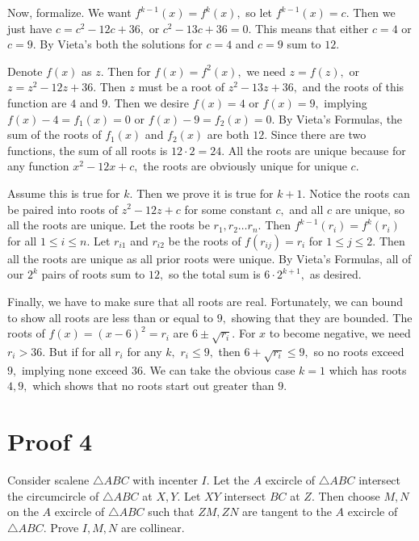 \documentclass{article}
\begin{document}
Now, formalize. We want $f^{k-1}(x)=f^{k}(x),$ so let $f^{k-1}(x)=c.$ Then we just have $c=c^2-12c+36,$ or $c^2-13c+36=0$. This means that either $c=4$ or $c=9.$ By Vieta's both the solutions for $c=4$ and $c=9$ sum to $12.$

\begin{sol}{}{}
Denote $f(x)$ as $z.$ Then for $f(x)=f^2(x),$ we need $z=f(z),$ or $z=z^2-12z+36.$ Then $z$ must be a root of $z^2-13z+36,$ and the roots of this function are $4$ and $9.$
Then we desire $f(x)=4$ or $f(x)=9,$ implying $f(x)-4=f_1(x)=0$ or $f(x)-9=f_2(x)=0.$ By Vieta's Formulas, the sum of the roots of $f_1(x)$ and $f_2(x)$ are both $12.$
Since there are two functions, the sum of all roots is $12\cdot 2=\boxed{24}.$
All the roots are unique because for any function $x^2-12x+c,$ the roots are obviously unique for unique $c.$

Assume this is true for $k.$ Then we prove it is true for $k+1.$ Notice the roots can be paired into roots of $z^2-12z+c$ for some constant $c,$ and all $c$ are unique, so all the roots are unique.
Let the roots be $r_1,r_2\dots r_n.$
Then $f^{k-1}(r_i)=f^k(r_i)$ for all $1\leq i\leq n.$
Let $r_{i1}$ and $r_{i2}$ be the roots of $f(r_{ij})=r_i$ for $1\leq j\leq 2.$
Then all the roots are unique as all prior roots were unique.
By Vieta's Formulas, all of our $2^k$ pairs of roots sum to $12,$ so the total sum is $6\cdot 2^{k+1},$ as desired.

Finally, we have to make sure that all roots are real. Fortunately, we can bound to show all roots are less than or equal to $9,$ showing that they are bounded.
The roots of $f(x)=(x-6)^2=r_i$ are $6\pm \sqrt{r_i}.$ For $x$ to become negative, we need $r_i>36.$ But if for all $r_i$ for any $k,$ $r_i\leq 9,$ then $6+\sqrt{r_i}\leq 9,$ so no roots exceed $9,$ implying none exceed $36.$ We can take the obvious case $k=1$ which has roots $4,9,$ which shows that no roots start out greater than $9.$
\end{sol}

\pagebreak\section{Proof 4}

Consider scalene $\triangle ABC$ with incenter $I.$ Let the $A$ excircle of $\triangle ABC$ intersect the circumcircle of $\triangle ABC$ at $X,Y.$ Let $XY$ intersect $BC$ at $Z.$ Then choose $M,N$ on the $A$ excircle of $\triangle ABC$ such that $ZM,ZN$ are tangent to the $A$ excircle of $\triangle ABC.$ Prove $I,M,N$ are collinear.
\end{document}
